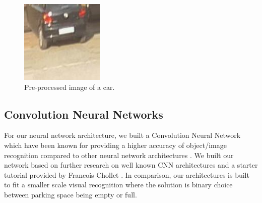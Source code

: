 \documentclass[conference]{IEEEtran}
\begin{document}
\begin{figure}[htbp]
\centerline{\includegraphics[width=\linewidth]{./random_car_transform.jpg}}
\caption{Pre-processed image of a car.}
\label{fig}
\end{figure}

\subsection{Convolution Neural Networks}
For our neural network architecture, we built a Convolution Neural Network which have been known for providing a higher accuracy of object/image recognition compared to other neural network architectures \cite{b4}. We built our network based on further research on well known CNN architectures and a starter tutorial provided by Francois Chollet \cite{b2}. In comparison, our architectures is built to fit a smaller scale visual recognition where the solution is binary choice between parking space being empty or full. 
\end{document}

